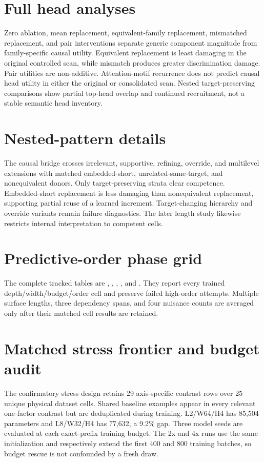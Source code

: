 \section{Full head analyses}
Zero ablation, mean replacement, equivalent-family replacement, mismatched replacement, and pair interventions separate generic component magnitude from family-specific causal utility. Equivalent replacement is least damaging in the original controlled scan, while mismatch produces greater discrimination damage. Pair utilities are non-additive. Attention-motif recurrence does not predict causal head utility in either the original or consolidated scan. Nested target-preserving comparisons show partial top-head overlap and continued recruitment, not a stable semantic head inventory.

\section{Nested-pattern details}
The causal bridge crosses irrelevant, supportive, refining, override, and multilevel extensions with matched embedded-short, unrelated-same-target, and nonequivalent donors. Only target-preserving strata clear competence. Embedded-short replacement is less damaging than nonequivalent replacement, supporting partial reuse of a learned increment. Target-changing hierarchy and override variants remain failure diagnostics. The later length study likewise restricts internal interpretation to competent cells.

\section{Predictive-order phase grid}
\begingroup\raggedright
The complete tracked tables are , , , , and . They report every trained depth/width/budget/order cell and preserve failed high-order attempts. Multiple surface lengths, three dependency spans, and four nuisance counts are averaged only after their matched cell results are retained.\par
\endgroup

\section{Matched stress frontier and budget audit}
The confirmatory stress design retains 29 axis-specific contrast rows over 25 unique physical dataset cells. Shared baseline examples appear in every relevant one-factor contrast but are deduplicated during training. L2/W64/H4 has 85,504 parameters and L8/W32/H4 has 77,632, a 9.2\% gap. Three model seeds are evaluated at each exact-prefix training budget. The 2x and 4x runs use the same initialization and respectively extend the first 400 and 800 training batches, so budget rescue is not confounded by a fresh draw.

